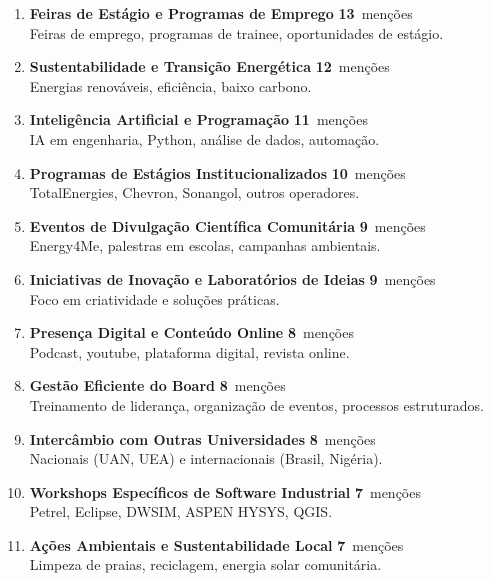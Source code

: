 \documentclass[12pt,a4paper]{article}
\newcommand{\freqstat}[2]{%
  {\large\bfseries\color{steelblue}#1}~{\small\color{muted}#2}%
}
\begin{document}
\begin{enumerate}[label={\color{steelblue}\bfseries\arabic*.}, itemsep=0.28cm]
\item \textbf{Feiras de Estágio e Programas de Emprego} \hfill \freqstat{13}{menções}\\
{\small\color{muted}Feiras de emprego, programas de trainee, oportunidades de estágio.}

\item \textbf{Sustentabilidade e Transição Energética} \hfill \freqstat{12}{menções}\\
{\small\color{muted}Energias renováveis, eficiência, baixo carbono.}

\item \textbf{Inteligência Artificial e Programação} \hfill \freqstat{11}{menções}\\
{\small\color{muted}IA em engenharia, Python, análise de dados, automação.}

\item \textbf{Programas de Estágios Institucionalizados} \hfill \freqstat{10}{menções}\\
{\small\color{muted}TotalEnergies, Chevron, Sonangol, outros operadores.}

\item \textbf{Eventos de Divulgação Científica Comunitária} \hfill \freqstat{9}{menções}\\
{\small\color{muted}Energy4Me, palestras em escolas, campanhas ambientais.}

\item \textbf{Iniciativas de Inovação e Laboratórios de Ideias} \hfill \freqstat{9}{menções}\\
{\small\color{muted}Foco em criatividade e soluções práticas.}

\item \textbf{Presença Digital e Conteúdo Online} \hfill \freqstat{8}{menções}\\
{\small\color{muted}Podcast, youtube, plataforma digital, revista online.}

\item \textbf{Gestão Eficiente do Board} \hfill \freqstat{8}{menções}\\
{\small\color{muted}Treinamento de liderança, organização de eventos, processos estruturados.}

\item \textbf{Intercâmbio com Outras Universidades} \hfill \freqstat{8}{menções}\\
{\small\color{muted}Nacionais (UAN, UEA) e internacionais (Brasil, Nigéria).}

\item \textbf{Workshops Específicos de Software Industrial} \hfill \freqstat{7}{menções}\\
{\small\color{muted}Petrel, Eclipse, DWSIM, ASPEN HYSYS, QGIS.}

\item \textbf{Ações Ambientais e Sustentabilidade Local} \hfill \freqstat{7}{menções}\\
{\small\color{muted}Limpeza de praias, reciclagem, energia solar comunitária.}

\end{enumerate}
\end{document}
